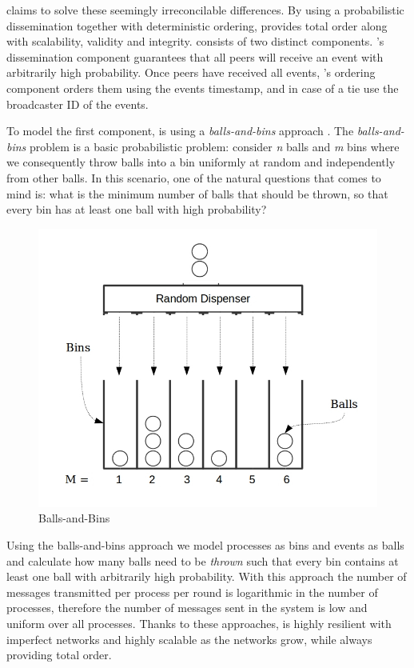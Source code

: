 \par
\epto claims to solve these seemingly irreconcilable differences. By using a probabilistic dissemination together with deterministic ordering, \epto provides total order along with scalability, validity and integrity. \epto consists of two distinct components. \epto's dissemination component guarantees that all peers will receive an event with arbitrarily high probability. Once peers have received all events, \epto's ordering component orders them using the events timestamp, and in case of a tie use the broadcaster ID of the events.
\par
To model the first component, \epto is using a \textit{balls-and-bins} approach \autocite{Koldehofe02simplegossiping}. The \textit{balls-and-bins} problem is a basic probabilistic problem: consider \textit{n} balls and \textit{m} bins where we consequently throw balls into a bin uniformly at random and independently from other balls. In this scenario, one of the natural questions that comes to mind is: what is the minimum number of balls that should be thrown, so that every bin has at least one ball with high probability?
\begin{figure}
	\includegraphics[width=\linewidth]{figures/BnB.jpeg}
	\caption[Caption]{Balls-and-Bins\footnotemark}
	\label{fig:balls-and-bins}
\end{figure}
\par
Using the balls-and-bins approach we model processes as bins and events as balls and calculate how many balls need to be \textit{thrown} such that every bin contains at least one ball with arbitrarily high probability. With this approach the number of messages transmitted per process per round is logarithmic in the number of processes, therefore the number of messages sent in the system is low and uniform over all processes. Thanks to these approaches, \epto is highly resilient with  imperfect networks and highly scalable as the networks grow, while always providing total order. \par
